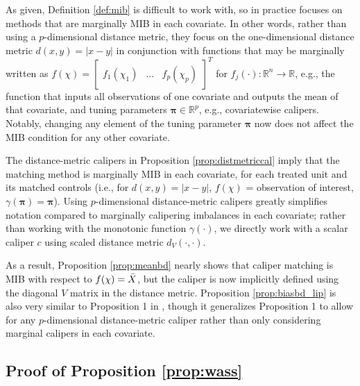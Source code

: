 \documentclass{article}
\newcommand{\R}{\mathbb{R}}
\begin{document}
As given, Definition \ref{def:mib} is difficult to work with, so in practice \citet{iacus2011multivariate} focuses on methods that are marginally MIB in each covariate.
In other words, rather than using a $p$-dimensional distance metric, they focus on the one-dimensional distance metric $d(x,y) = |x-y|$ in conjunction with functions that may be marginally written as $f(\chi) = \begin{bmatrix}
    f_1(\chi_1) & \dots & f_p(\chi_p)
\end{bmatrix}^T$ for $f_j(\cdot): \mathbb{R}^n \to \mathbb{R}$, e.g., the function that inputs all observations of one covariate and outputs the mean of that covariate, and tuning parameters $\boldsymbol{\pi} \in \R^p$, e.g., covariatewise calipers.
Notably, changing any element of the tuning parameter $\boldsymbol{\pi}$ now does not affect the MIB condition for any other covariate.

The distance-metric calipers in Proposition \ref{prop:distmetriccal} imply that the matching method  is marginally MIB in each covariate, for each treated unit and its matched controls (i.e., for $d(x,y)=|x-y|$, $f(\chi)$ = observation of interest, $\gamma(\boldsymbol{\pi})=\boldsymbol{\pi}$).
Using $p$-dimensional distance-metric calipers greatly simplifies notation compared to marginally calipering imbalances in each covariate;
rather than working with the monotonic function $\gamma(\cdot)$, we directly work with a scalar caliper $c$ using scaled distance metric $d_V(\cdot, \cdot)$.

As a result, Proposition \ref{prop:meanbd} nearly shows that caliper matching is MIB with respect to $f(\chi)=\Bar{X}$, but the caliper is now implicitly defined using the diagonal $V$ matrix in the distance metric.
Proposition \ref{prop:biasbd_lip} is also very similar to Proposition 1 in \citet{iacus2011multivariate}, though it generalizes Proposition 1 to allow for any $p$-dimensional distance-metric caliper rather than only considering marginal calipers in each covariate.


\subsection{Proof of Proposition \ref{prop:wass}}
\label{app:wass}

\end{document}
